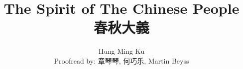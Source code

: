 \documentclass[a4paper,12pt]{book}
\begin{document}
\title{The Spirit of The Chinese People \\ 春秋大義}
\author{Hung-Ming Ku \\ Proofread by: 章琴琴, 何巧乐, Martin Beyss}

\maketitle
\afterpage{\newpage~}



\tableofcontents

\frontmatter
    
    

\mainmatter
    
    
    
    
    
    
    
    \begin{appendices}
        
    \end{appendices}

    
    
\end{document}
